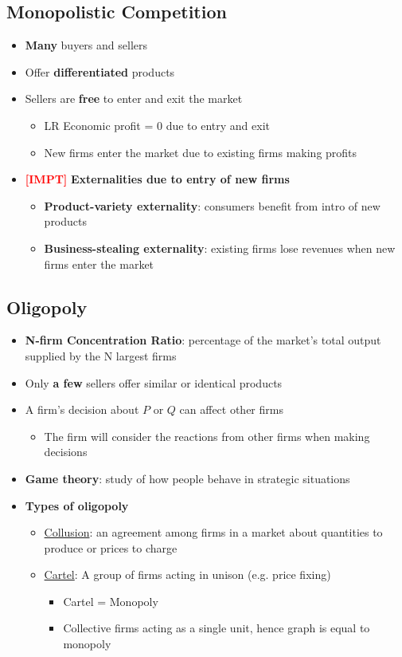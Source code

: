 \documentclass{article}
\newcommand{\impt}[0]{\textcolor{red}{\textbf{[IMPT] }}}
\begin{document}
\begin{multicols}{2}
\subsection{Monopolistic Competition}
\begin{itemize}
	\item \textbf{Many} buyers and sellers
	\item Offer \textbf{differentiated} products
	\item Sellers are \textbf{free} to enter and exit the market
	\begin{itemize}
		\item LR Economic profit = 0 due to entry and exit
		\item New firms enter the market due to existing firms making profits
	\end{itemize}
    \item \impt \textbf{Externalities due to entry of new firms}
    \begin{itemize}
    	\item \textbf{Product-variety externality}: consumers benefit from intro of new products
    	\item \textbf{Business-stealing externality}: existing firms lose revenues when new firms enter the market
    \end{itemize}
\end{itemize}
\subsection{Oligopoly}
\begin{itemize}
	\item \textbf{N-firm Concentration Ratio}: percentage of the market's total output supplied by the N largest firms
	\item Only \textbf{a few} sellers offer similar or identical products
	\item A firm's decision about $P$ or $Q$ can affect other firms
	\begin{itemize}
		\item The firm will consider the reactions from other firms when making decisions
	\end{itemize}
    \item \textbf{Game theory}: study of how people behave in strategic situations
    \item \textbf{Types of oligopoly}
    \begin{itemize}
    	\item \underline{Collusion}: an agreement among firms in a market about quantities to produce or prices to charge
    	\item \underline{Cartel}: A group of firms acting in unison (e.g. price fixing)
    	\begin{itemize}
    		\item Cartel = Monopoly
    		\item Collective firms acting as a single unit, hence graph is equal to monopoly
    	\end{itemize}
    \end{itemize}
\end{itemize}

\end{multicols}
\end{document}
